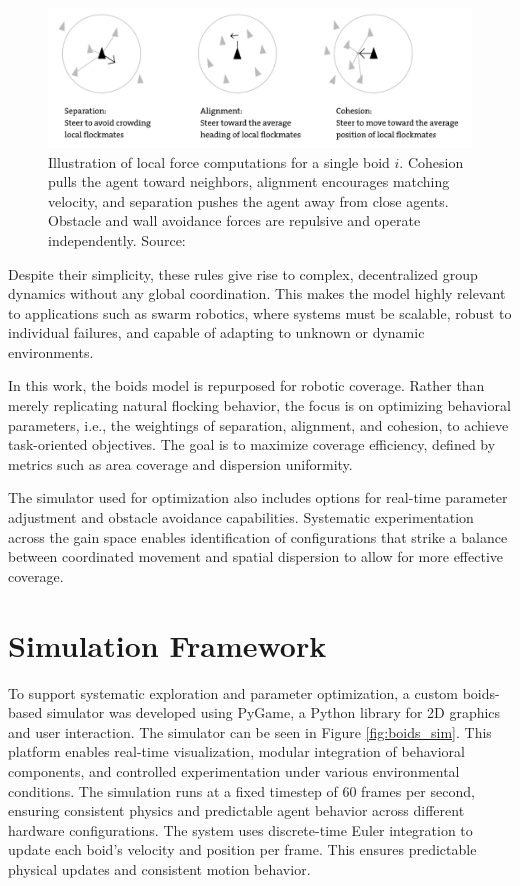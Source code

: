 \documentclass[12pt]{article}
\begin{document}
\begin{linenumbers}
\begin{figure}[h!]
    \centering
    \includegraphics[width=0.7\linewidth]{force_diagram.png}
    \caption{Illustration of local force computations for a single boid \(i\). Cohesion pulls the agent toward neighbors, alignment encourages matching velocity, and separation pushes the agent away from close agents. Obstacle and wall avoidance forces are repulsive and operate independently. Source: \cite{martinez2023boids}}
    \label{fig:force_diagram}
  \end{figure}

Despite their simplicity, these rules give rise to complex, decentralized group dynamics without any global coordination. This makes the model highly relevant to applications such as swarm robotics, where systems must be scalable, robust to individual failures, and capable of adapting to unknown or dynamic environments.

In this work, the boids model is repurposed for robotic coverage. Rather than merely replicating natural flocking behavior, the focus is on optimizing behavioral parameters, i.e., the weightings of separation, alignment, and cohesion, to achieve task-oriented objectives. The goal is to maximize coverage efficiency, defined by metrics such as area coverage and dispersion uniformity.

The simulator used for optimization also includes options for real-time parameter adjustment and obstacle avoidance capabilities. Systematic experimentation across the gain space enables identification of configurations that strike a balance between coordinated movement and spatial dispersion to allow for more effective coverage.

\section{Simulation Framework}

To support systematic exploration and parameter optimization, a custom boids-based simulator was developed using PyGame, a Python library for 2D graphics and user interaction. The simulator can be seen in Figure \ref{fig:boids_sim}. This platform enables real-time visualization, modular integration of behavioral components, and controlled experimentation under various environmental conditions. The simulation runs at a fixed timestep of 60 frames per second, ensuring consistent physics and predictable agent behavior across different hardware configurations. The system uses discrete-time Euler integration to update each boid's velocity and position per frame. This ensures predictable physical updates and consistent motion behavior.


\end{linenumbers}
\end{document}
